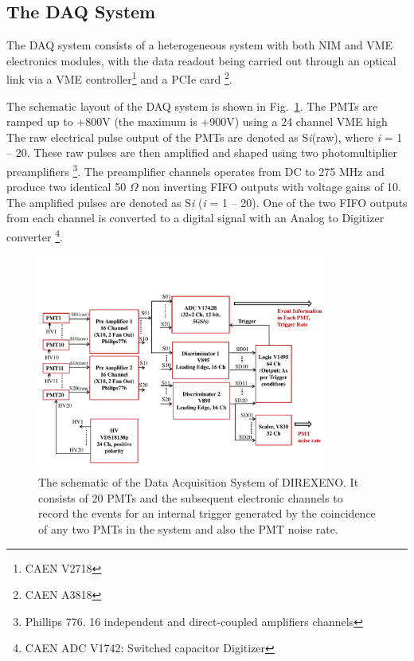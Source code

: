 \subsection{The DAQ System }
\label{sec:DAQ}


The DAQ system consists of a heterogeneous system with both 
NIM and VME electronics modules, with the data readout being carried out 
through an optical link via a VME controller\footnote{CAEN V2718} and a 
PCIe card \footnote{CAEN A3818}. 

The schematic layout of the DAQ system is shown in Fig.~{\ref{Fig:DAQscheme}}. 
The PMTs are ramped up to +800V (the maximum is +900V) using a 24 channel VME high 
The raw electrical pulse output of the PMTs are denoted as S{\it i}(raw), where {\it i} = 1 -- 20. 
These raw pulses are then amplified and shaped using two photomultiplier preamplifiers 
\footnote{Phillips 776. 16 independent and direct-coupled amplifiers channels}. 
The preamplifier channels operates from DC to 275 MHz and produce two identical 
50 $\Omega$ non inverting FIFO outputs with voltage gains of 10. 
The amplified pulses are denoted as S{\it i} 
({\it i} = 1 -- 20). One of the two FIFO outputs from each channel is converted to a 
digital signal with an Analog to Digitizer converter \footnote{CAEN ADC V1742: Switched capacitor Digitizer}. 

\begin{figure}[h]
   \centering
   \includegraphics[width=0.85\textwidth]{DAQscheme.pdf}
   \caption{The schematic of the Data Acquisition System of DIREXENO. It 
        consists of 20 PMTs and the subsequent electronic channels to record 
        the events for an internal trigger generated by the coincidence of any 
        two PMTs in the system and also the PMT noise rate.}
   \label{Fig:DAQscheme}
\end{figure}

